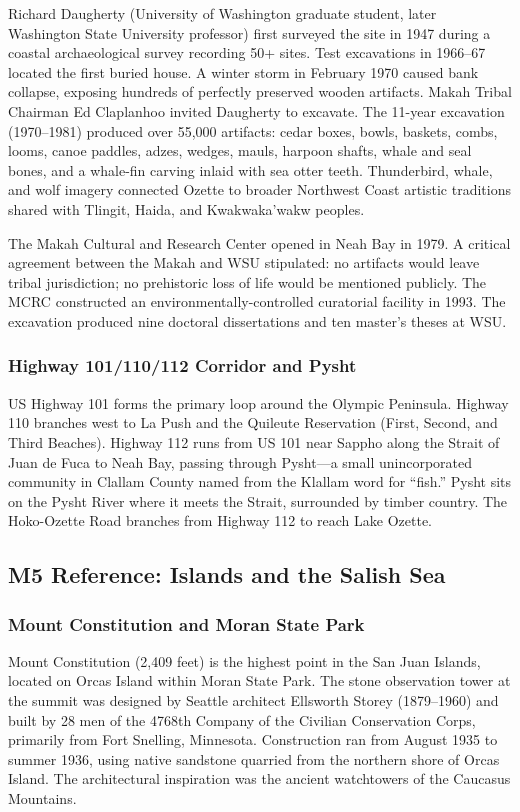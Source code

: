 \documentclass[11pt,letterpaper]{article}
\begin{document}
Richard Daugherty (University of Washington graduate student, later Washington State University professor) first surveyed the site in 1947 during a coastal archaeological survey recording 50+ sites. Test excavations in 1966--67 located the first buried house. A winter storm in February 1970 caused bank collapse, exposing hundreds of perfectly preserved wooden artifacts. Makah Tribal Chairman Ed Claplanhoo invited Daugherty to excavate. The 11-year excavation (1970--1981) produced over 55,000 artifacts: cedar boxes, bowls, baskets, combs, looms, canoe paddles, adzes, wedges, mauls, harpoon shafts, whale and seal bones, and a whale-fin carving inlaid with sea otter teeth. Thunderbird, whale, and wolf imagery connected Ozette to broader Northwest Coast artistic traditions shared with Tlingit, Haida, and Kwakwaka'wakw peoples.

The Makah Cultural and Research Center opened in Neah Bay in 1979. A critical agreement between the Makah and WSU stipulated: no artifacts would leave tribal jurisdiction; no prehistoric loss of life would be mentioned publicly. The MCRC constructed an environmentally-controlled curatorial facility in 1993. The excavation produced nine doctoral dissertations and ten master's theses at WSU.

\subsubsection{Highway 101/110/112 Corridor and Pysht}
US Highway 101 forms the primary loop around the Olympic Peninsula. Highway 110 branches west to La Push and the Quileute Reservation (First, Second, and Third Beaches). Highway 112 runs from US 101 near Sappho along the Strait of Juan de Fuca to Neah Bay, passing through Pysht---a small unincorporated community in Clallam County named from the Klallam word for ``fish.'' Pysht sits on the Pysht River where it meets the Strait, surrounded by timber country. The Hoko-Ozette Road branches from Highway 112 to reach Lake Ozette.

\subsection{M5 Reference: Islands and the Salish Sea}

\subsubsection{Mount Constitution and Moran State Park}
Mount Constitution (2,409 feet) is the highest point in the San Juan Islands, located on Orcas Island within Moran State Park. The stone observation tower at the summit was designed by Seattle architect Ellsworth Storey (1879--1960) and built by 28 men of the 4768th Company of the Civilian Conservation Corps, primarily from Fort Snelling, Minnesota. Construction ran from August 1935 to summer 1936, using native sandstone quarried from the northern shore of Orcas Island. The architectural inspiration was the ancient watchtowers of the Caucasus Mountains.
\end{document}
